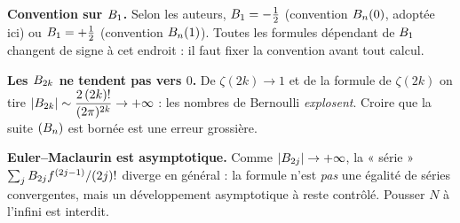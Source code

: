\vspace{6pt}

\begin{mdframed}[style=cexbar]
  \textbf{Convention sur $B_{1}$.}\enspace%
  Selon les auteurs, $B_{1}=-\tfrac{1}{2}$ (convention $B_{n}(0)$, adoptée
  ici) ou $B_{1}=+\tfrac{1}{2}$ (convention $B_{n}(1)$). Toutes les
  formules dépendant de $B_{1}$ changent de signe à cet endroit : il faut
  fixer la convention avant tout calcul.

  \smallskip\noindent
  \textbf{Les $B_{2k}$ ne tendent pas vers $0$.}\enspace%
  De $\zeta(2k)\to 1$ et de la formule de $\zeta(2k)$ on tire
  $|B_{2k}|\sim \dfrac{2\,(2k)!}{(2\pi)^{2k}}\to+\infty$ : les nombres de
  Bernoulli \emph{explosent}. Croire que la suite $(B_{n})$ est bornée est
  une erreur grossière.

  \smallskip\noindent
  \textbf{Euler--Maclaurin est asymptotique.}\enspace%
  Comme $|B_{2j}|\to+\infty$, la « série » $\sum_{j}B_{2j}f^{(2j-1)}/(2j)!$
  diverge en général : la formule n'est \emph{pas} une égalité de séries
  convergentes, mais un développement asymptotique à reste contrôlé. Pousser
  $N$ à l'infini est interdit.
\end{mdframed}

\vspace{6pt}
\exolabel

